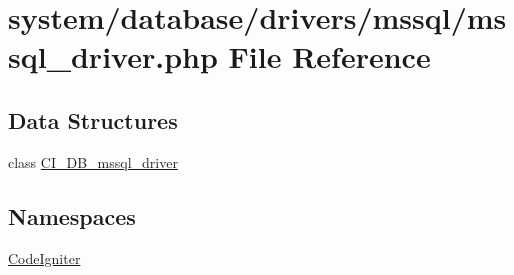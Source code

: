 \hypertarget{mssql__driver_8php}{\section{system/database/drivers/mssql/mssql\-\_\-driver.php File Reference}
\label{mssql__driver_8php}
}
\subsection*{Data Structures}
\begin{DoxyCompactItemize}
\item 
class \hyperlink{class_c_i___d_b__mssql__driver}{C\-I\-\_\-\-D\-B\-\_\-mssql\-\_\-driver}
\end{DoxyCompactItemize}
\subsection*{Namespaces}
\begin{DoxyCompactItemize}
\item 
\hyperlink{namespace_code_igniter}{Code\-Igniter}
\end{DoxyCompactItemize}
